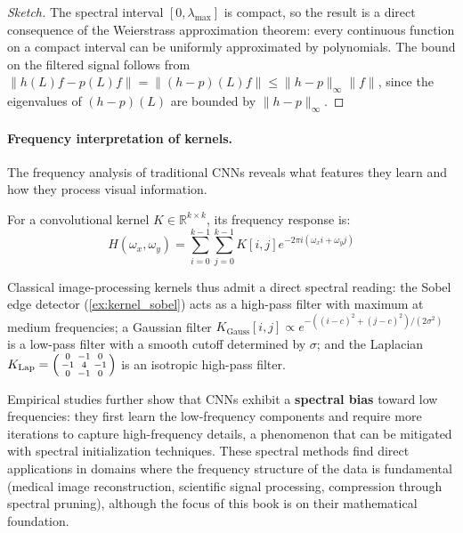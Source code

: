 \begin{proof}[Sketch]
The spectral interval $[0, \lambda_{\max}]$ is compact, so the result is a direct consequence of the Weierstrass approximation theorem: every continuous function on a compact interval can be uniformly approximated by polynomials. The bound on the filtered signal follows from $\|h(L)f - p(L)f\| = \|(h-p)(L)f\| \leq \|h - p\|_\infty \|f\|$, since the eigenvalues of $(h-p)(L)$ are bounded by $\|h-p\|_\infty$.
\end{proof}

\paragraph{Frequency interpretation of kernels.} The frequency analysis of traditional CNNs reveals what features they learn and how they process visual information.

\begin{definition}\label{def:respuesta_frecuencial_kernel}
For a convolutional kernel $K \in \mathbb{R}^{k \times k}$, its frequency response is:
\begin{equation}
H(\omega_x, \omega_y) = \sum_{i=0}^{k-1} \sum_{j=0}^{k-1} K[i,j] e^{-2\pi i(\omega_x i + \omega_y j)}
\end{equation}
\end{definition}

Classical image-processing kernels thus admit a direct spectral reading: the Sobel edge detector (\autoref{ex:kernel_sobel}) acts as a high-pass filter with maximum at medium frequencies; a Gaussian filter $K_{\text{Gauss}}[i,j] \propto e^{-((i-c)^2 + (j-c)^2)/(2\sigma^2)}$ is a low-pass filter with a smooth cutoff determined by $\sigma$; and the Laplacian $K_{\text{Lap}} = \begin{psmallmatrix} 0 & -1 & 0 \\ -1 & 4 & -1 \\ 0 & -1 & 0 \end{psmallmatrix}$ is an isotropic high-pass filter.

Empirical studies further show that CNNs exhibit a \textbf{spectral bias} toward low frequencies: they first learn the low-frequency components and require more iterations to capture high-frequency details, a phenomenon that can be mitigated with spectral initialization techniques. These spectral methods find direct applications in domains where the frequency structure of the data is fundamental (medical image reconstruction, scientific signal processing, compression through spectral pruning), although the focus of this book is on their mathematical foundation.

